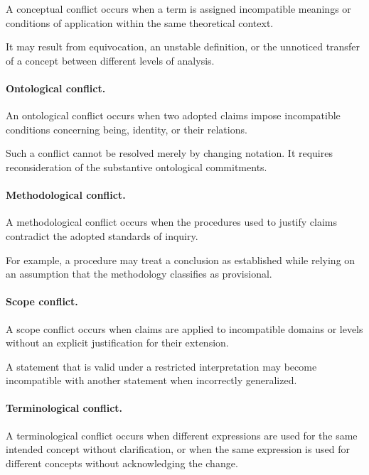 A conceptual conflict occurs when a term is assigned
incompatible meanings or conditions of application
within the same theoretical context.

It may result from equivocation, an unstable definition,
or the unnoticed transfer of a concept between different
levels of analysis.

\paragraph{Ontological conflict.}

An ontological conflict occurs when two adopted claims
impose incompatible conditions concerning being, identity,
or their relations.

Such a conflict cannot be resolved merely by changing
notation. It requires reconsideration of the substantive
ontological commitments.

\paragraph{Methodological conflict.}

A methodological conflict occurs when the procedures
used to justify claims contradict the adopted standards
of inquiry.

For example, a procedure may treat a conclusion as
established while relying on an assumption that the
methodology classifies as provisional.

\paragraph{Scope conflict.}

A scope conflict occurs when claims are applied to
incompatible domains or levels without an explicit
justification for their extension.

A statement that is valid under a restricted interpretation
may become incompatible with another statement when
incorrectly generalized.

\paragraph{Terminological conflict.}

A terminological conflict occurs when different expressions
are used for the same intended concept without clarification,
or when the same expression is used for different concepts
without acknowledging the change.

